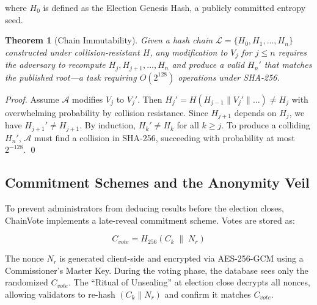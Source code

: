 \documentclass[journal,10pt,twocolumn]{IEEEtran}
\newtheorem{theorem}{Theorem}
\begin{document}
where $H_0$ is defined as the Election Genesis Hash, a publicly committed entropy seed.

\begin{theorem}[Chain Immutability]
Given a hash chain $\mathcal{L} = \{H_0, H_1, \ldots, H_n\}$ constructed under collision-resistant $H$, any modification to $V_j$ for $j \le n$ requires the adversary to recompute $H_j, H_{j+1}, \ldots, H_n$ and produce a valid $H_n'$ that matches the published root—a task requiring $O(2^{128})$ operations under SHA-256.
\end{theorem}

\begin{proof}
Assume $\mathcal{A}$ modifies $V_j$ to $V_j'$. Then $H_j' = H(H_{j-1} \| V_j' \| \ldots) \neq H_j$ with overwhelming probability by collision resistance. Since $H_{j+1}$ depends on $H_j$, we have $H_{j+1}' \neq H_{j+1}$. By induction, $H_k' \neq H_k$ for all $k \ge j$. To produce a colliding $H_n'$, $\mathcal{A}$ must find a collision in SHA-256, succeeding with probability at most $2^{-128}$. \qed
\end{proof}

\subsection{Commitment Schemes and the Anonymity Veil}

To prevent administrators from deducing results before the election closes, ChainVote implements a late-reveal commitment scheme. Votes are stored as:

\begin{equation}
    C_{vote} = H_{256}(C_k \;\|\; N_{r})
\end{equation}

The nonce $N_r$ is generated client-side and encrypted via AES-256-GCM using a Commissioner's Master Key. During the voting phase, the database sees only the randomized $C_{vote}$. The ``Ritual of Unsealing'' at election close decrypts all nonces, allowing validators to re-hash $(C_k \| N_{r})$ and confirm it matches $C_{vote}$.
\end{document}
